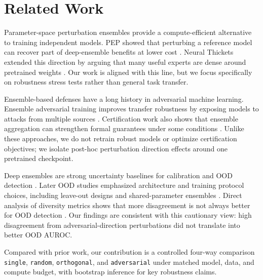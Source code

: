 \section{Related Work}
\label{sec:related_work}

 Parameter-space perturbation ensembles provide a compute-efficient alternative to training independent models. PEP showed that perturbing a reference model can recover part of deep-ensemble benefits at lower cost \citep{mehrtash2020pep}. Neural Thickets extended this direction by arguing that many useful experts are dense around pretrained weights \citep{gan2026neuralthickets}. Our work is aligned with this line, but we focus specifically on robustness stress tests rather than general task transfer.

 Ensemble-based defenses have a long history in adversarial machine learning. Ensemble adversarial training improves transfer robustness by exposing models to attacks from multiple sources \citep{tramer2018ensemble}. Certification work also shows that ensemble aggregation can strengthen formal guarantees under some conditions \citep{ahmad2020certifying,zhang2019certifiable}. Unlike these approaches, we do not retrain robust models or optimize certification objectives; we isolate post-hoc perturbation direction effects around one pretrained checkpoint.

 Deep ensembles are strong uncertainty baselines for calibration and OOD detection \citep{lakshminarayanan2017deep}. Later OOD studies emphasized architecture and training protocol choices, including leave-out designs and shared-parameter ensembles \citep{vyas2018ood,chen2022batchensemble}. Direct analysis of diversity metrics shows that more disagreement is not always better for OOD detection \citep{xia2022usefulness}. Our findings are consistent with this cautionary view: high disagreement from adversarial-direction perturbations did not translate into better OOD AUROC.

 Compared with prior work, our contribution is a controlled four-way comparison \texttt{single}, \texttt{random}, \texttt{orthogonal}, and \texttt{adversarial} under matched model, data, and compute budget, with bootstrap inference for key robustness claims.
